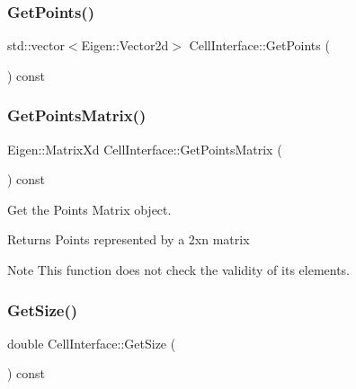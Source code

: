 \subsubsection{\texorpdfstring{Get\+Points()}{GetPoints()}}
{\footnotesize\ttfamily std\+::vector$<$Eigen\+::\+Vector2d$>$ Cell\+Interface\+::\+Get\+Points (\begin{DoxyParamCaption}{ }\end{DoxyParamCaption}) const\hspace{0.3cm}{\ttfamily [inline]}}

\mbox{\label{classCellInterface_abf249487edef6811dda54d7b3ee9d710}} 
\subsubsection{\texorpdfstring{Get\+Points\+Matrix()}{GetPointsMatrix()}}
{\footnotesize\ttfamily Eigen\+::\+Matrix\+Xd Cell\+Interface\+::\+Get\+Points\+Matrix (\begin{DoxyParamCaption}{ }\end{DoxyParamCaption}) const\hspace{0.3cm}{\ttfamily [inline]}}



Get the Points Matrix object. 

\begin{DoxyReturn}{Returns}
Points represented by a {\ttfamily 2xn} matrix 
\end{DoxyReturn}
\begin{DoxyNote}{Note}
This function does not check the validity of its elements. 
\end{DoxyNote}
\mbox{\label{classCellInterface_a21bb156a72ad4502808efaab900094d3}} 
\subsubsection{\texorpdfstring{Get\+Size()}{GetSize()}}
{\footnotesize\ttfamily double Cell\+Interface\+::\+Get\+Size (\begin{DoxyParamCaption}{ }\end{DoxyParamCaption}) const\hspace{0.3cm}{\ttfamily [inline]}}



